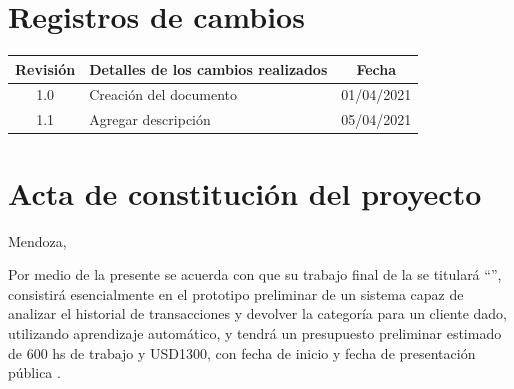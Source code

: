 \documentclass[11pt]{charter}
\begin{document}
\maketitle
\thispagestyle{empty}
\pagebreak


\thispagestyle{empty}
{\setlength{\parskip}{0pt}
\tableofcontents{}
}
\pagebreak


\section{Registros de cambios}
\label{sec:registro}


\begin{table}[ht]
\label{tab:registro}
\centering
\begin{tabularx}{\linewidth}{@{}|c|X|c|@{}}
\hline
\rowcolor[HTML]{C0C0C0} 
Revisión & \multicolumn{1}{c|}{\cellcolor[HTML]{C0C0C0}Detalles de los cambios realizados} & Fecha      \\ \hline
1.0      & Creación del documento                                          & 01/04/2021 \\ \hline
1.1      & Agregar descripción                                          & 05/04/2021 \\ \hline
\end{tabularx}
\end{table}

\pagebreak



\section{Acta de constitución del proyecto}
\label{sec:acta}

\begin{flushright}
Mendoza, \fechaInicioName
\end{flushright}

\vspace{2cm}

Por medio de la presente se acuerda con \authorname\hspace{1px} que su trabajo final de la \degreename\hspace{1px} 
se titulará ``\ttitle'', consistirá esencialmente en el prototipo preliminar de un sistema capaz de analizar el historial de 
transacciones y devolver la categoría para un cliente dado, utilizando aprendizaje automático, y tendrá un presupuesto 
preliminar estimado de 600 hs de trabajo y USD1300, con fecha de inicio \fechaInicioName\hspace{1px} y fecha de presentación 
pública \fechaFinalName.
\end{document}
